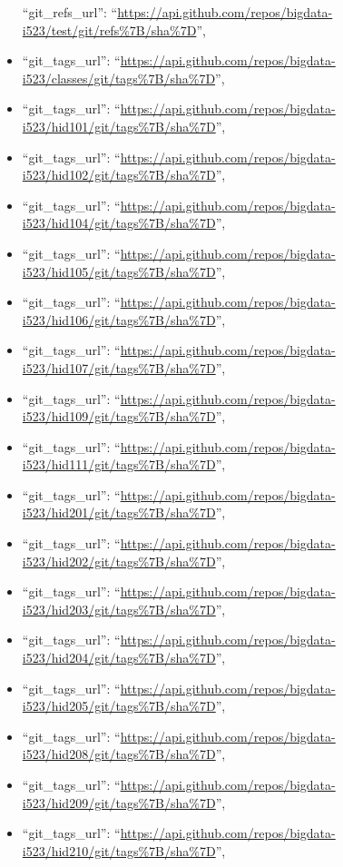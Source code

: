 \begin{itemize}
  ``git\_refs\_url'':
  ``\url{https://api.github.com/repos/bigdata-i523/test/git/refs\%7B/sha\%7D}'',
\item
  ``git\_tags\_url'':
  ``\url{https://api.github.com/repos/bigdata-i523/classes/git/tags\%7B/sha\%7D}'',
\item
  ``git\_tags\_url'':
  ``\url{https://api.github.com/repos/bigdata-i523/hid101/git/tags\%7B/sha\%7D}'',
\item
  ``git\_tags\_url'':
  ``\url{https://api.github.com/repos/bigdata-i523/hid102/git/tags\%7B/sha\%7D}'',
\item
  ``git\_tags\_url'':
  ``\url{https://api.github.com/repos/bigdata-i523/hid104/git/tags\%7B/sha\%7D}'',
\item
  ``git\_tags\_url'':
  ``\url{https://api.github.com/repos/bigdata-i523/hid105/git/tags\%7B/sha\%7D}'',
\item
  ``git\_tags\_url'':
  ``\url{https://api.github.com/repos/bigdata-i523/hid106/git/tags\%7B/sha\%7D}'',
\item
  ``git\_tags\_url'':
  ``\url{https://api.github.com/repos/bigdata-i523/hid107/git/tags\%7B/sha\%7D}'',
\item
  ``git\_tags\_url'':
  ``\url{https://api.github.com/repos/bigdata-i523/hid109/git/tags\%7B/sha\%7D}'',
\item
  ``git\_tags\_url'':
  ``\url{https://api.github.com/repos/bigdata-i523/hid111/git/tags\%7B/sha\%7D}'',
\item
  ``git\_tags\_url'':
  ``\url{https://api.github.com/repos/bigdata-i523/hid201/git/tags\%7B/sha\%7D}'',
\item
  ``git\_tags\_url'':
  ``\url{https://api.github.com/repos/bigdata-i523/hid202/git/tags\%7B/sha\%7D}'',
\item
  ``git\_tags\_url'':
  ``\url{https://api.github.com/repos/bigdata-i523/hid203/git/tags\%7B/sha\%7D}'',
\item
  ``git\_tags\_url'':
  ``\url{https://api.github.com/repos/bigdata-i523/hid204/git/tags\%7B/sha\%7D}'',
\item
  ``git\_tags\_url'':
  ``\url{https://api.github.com/repos/bigdata-i523/hid205/git/tags\%7B/sha\%7D}'',
\item
  ``git\_tags\_url'':
  ``\url{https://api.github.com/repos/bigdata-i523/hid208/git/tags\%7B/sha\%7D}'',
\item
  ``git\_tags\_url'':
  ``\url{https://api.github.com/repos/bigdata-i523/hid209/git/tags\%7B/sha\%7D}'',
\item
  ``git\_tags\_url'':
  ``\url{https://api.github.com/repos/bigdata-i523/hid210/git/tags\%7B/sha\%7D}'',

\end{itemize}
